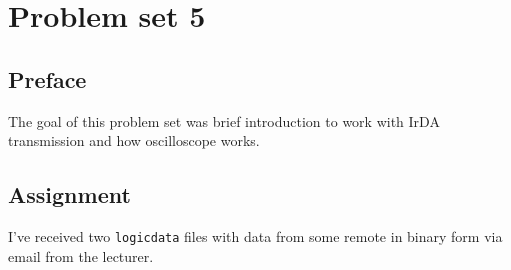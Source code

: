 \section{Problem set 5}
\subsection{Preface}

The goal of this problem set was brief introduction to work with IrDA transmission
and how oscilloscope works.

\subsection{Assignment}

I've received two \texttt{logicdata} files with data from some remote in binary form via email from the lecturer.
